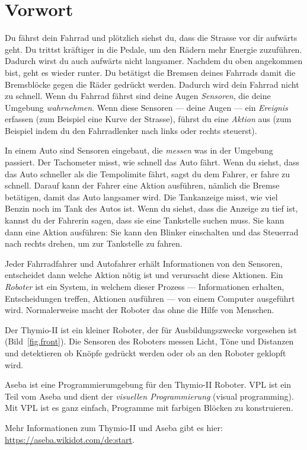 \chapter*{Vorwort}


Du fährst dein Fahrrad und plötzlich siehst du, dass die Strasse vor dir
aufwärts geht.  Du trittst kräftiger in die Pedale, um den Rädern mehr Energie
zuzuführen. Dadurch wirst du auch aufwärts nicht langsamer. Nachdem du oben
angekommen bist, geht es wieder runter. Du betätigst die Bremsen deines
Fahrrads damit die Bremsblöcke gegen die Räder gedrückt werden. Dadurch wird
dein Fahrrad nicht zu schnell.  Wenn du Fahrrad fährst sind deine Augen
\emph{Sensoren}, die deine Umgebung \emph{wahrnehmen}. Wenn diese Sensoren ---
deine Augen --- ein \emph{Ereignis} erfassen (zum Beispiel eine Kurve der
Strasse), führst du eine \emph{Aktion} aus (zum Beispiel indem du den
Fahrradlenker nach links oder rechts steuerst).

In einem Auto sind Sensoren eingebaut, die \emph{messen} was in der Umgebung
passiert. Der Tachometer misst, wie schnell das Auto fährt. Wenn du siehst, dass
das Auto schneller als die Tempolimite fährt, sagst du dem Fahrer, er fahre zu
schnell. Darauf kann der Fahrer eine Aktion ausführen, nämlich die Bremse
betätigen, damit das Auto langsamer wird. Die Tankanzeige misst, wie viel Benzin
noch im Tank des Autos ist. Wenn du siehst, dass die Anzeige zu tief ist,
kannst du der Fahrerin sagen, dass sie eine Tankstelle suchen muss. Sie kann
dann eine Aktion ausführen: Sie kann den Blinker einschalten und das Steuerrad
nach rechts drehen, um zur Tankstelle zu fahren.

Jeder Fahrradfahrer und Autofahrer erhält Informationen von den Sensoren,
entscheidet dann welche Aktion nötig ist und verursacht diese Aktionen.
Ein \emph{Roboter} ist ein System, in welchem dieser Prozess --- Informationen
erhalten, Entscheidungen treffen, Aktionen ausführen --- von einem Computer
ausgeführt wird. Normalerweise macht der Roboter das ohne die Hilfe von
Menschen.


Der Thymio-II ist ein kleiner Roboter, der für Ausbildungszwecke vorgesehen ist
(Bild~\ref{fig.front}). Die Sensoren des Roboters messen Licht, Töne und
Distanzen und detektieren ob Knöpfe gedrückt werden oder ob an den Roboter
geklopft wird.

Aseba ist eine Programmierumgebung für den Thymio-II Roboter. VPL ist ein Teil
vom Aseba und dient der \emph{visuellen Programmierung} (visual programming).
Mit VPL ist es ganz einfach, Programme mit farbigen Blöcken zu konstruieren.

Mehr Informationen zum Thymio-II und Aseba gibt es hier: \url{https://aseba.wikidot.com/de:start}.


